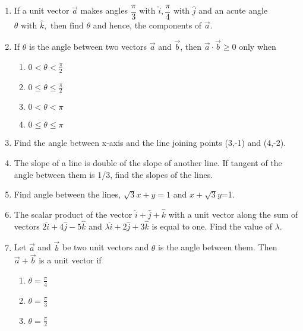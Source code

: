 \begin{enumerate}[label=\thesection.\arabic*,ref=\thesection.\theenumi]
		
\item If a unit vector $\overrightarrow{a}$ makes angles $\dfrac{\pi}{3}\text{ with }\hat{i}, \dfrac{\pi}{4}\text{ with }\hat{j}$ and an acute angle $\theta \text{ with }\hat{k},\text{ then find } \theta$ and hence, the components of $\overrightarrow{a}$.
	\\
		\solution
		
\item If $\theta$ is the angle between two vectors $\vec{a}$ and $\vec{b}$, then $\vec{a} \cdot \vec{b}\geq0$ only when 
\begin{enumerate}
\item \label{itm:chapters/12/10/5/161} $0<\theta<\frac{\pi}{2}$
\item \label{itm:chapters/12/10/5/162} $0\le\theta\le\frac{\pi}{2}$
\item \label{itm:chapters/12/10/5/163} $0<\theta<\pi$
\item \label{itm:chapters/12/10/5/164} $0\le\theta\le\pi$
\end{enumerate}
	\solution
		
\item Find the angle between x-axis and the line joining points (3,-1) and (4,-2).
\label{chapters/11/10/1/10}
\\
\solution 

	\item The slope of a line is double of the slope of another line. If tangent of the angle between them is 1/3, find the slopes of the lines.
\label{chapters/11/10/1/11}
\\
\solution 

\item    Find angle between the lines, $\sqrt{3}x+y=1$ and $x+\sqrt{3}y$=1.
\label{chapters/11/10/3/9}
   \solution 

\item The scalar product of the vector $\hat{i}+\hat{j}+\hat{k}$ with a unit vector along the sum of vectors $2\hat{i}+4\hat{j}-5\hat{k}$ and $\lambda\hat{i}+2\hat{j}+3\hat{k}$ is equal to one. Find the value of $\lambda$.
\item Let $\vec{a}$ and $\vec{b}$ be two unit vectors and $\theta$ is the angle between them. Then $\vec{a}+\vec{b}$ is a unit vector if
\begin{enumerate}
\item $\theta=\frac{\pi}{4}$
\item $\theta=\frac{\pi}{3}$
\item $\theta=\frac{\pi}{2}$

\end{enumerate}
\end{enumerate}
